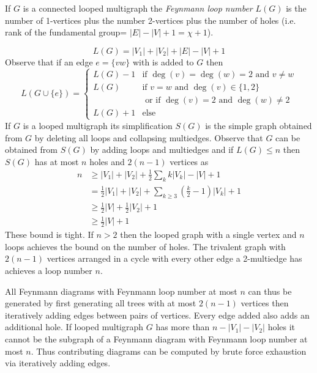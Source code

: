 \documentclass[12pt]{article}
\begin{document}
If $G$ is a connected looped multigraph the \emph{Feynmann loop number} 
$L(G)$ is
the number of 1-vertices plus the number 2-vertices plus the number of holes
(i.e. rank of the fundamental group= $|E|-|V|+1 =\chi+1$).

$$
L(G)=|V_1|+|V_2|+|E|-|V|+1
$$
Observe that if an edge $e=\{vw\}$  with is added to $G$ then
$$
 L(G\cup\{e\}) =
  \begin{cases}
   L(G)-1 & \text{if } \deg(v)=\deg(w)=2 \mbox{ and } v \neq w \\
   L(G) & \text{if } v=w \mbox{ and } \deg(v) \in \{1,2\} \\
        & \text{ or if } \deg(v)=2 \mbox{ and } \deg(w) \neq 2 \\
   L(G)+1  &  \text{else}
  \end{cases}
$$     
If $G$ is a looped multigraph its simplification $S(G)$ is the simple graph
obtained from $G$ by deleting all loops and collapsing multiedges.
Observe that $G$ can be obtained from $S(G)$ by adding loops and multiedges and
if $L(G) \leq n$ then $S(G)$ has at most $n$ holes and $2(n-1)$ vertices as
\begin{align*}
n &\geq |V_1|+|V_2| + \frac 1 2 \sum_k k|V_k| -|V|+1 \\
&= \frac 1 2 |V_1| + |V_2| +\sum_{k\geq 3} \left (\frac k 2 - 1 \right) |V_k|+1 \\
&\geq \frac 1 2 |V|+\frac 1 2 |V_2|+1 \\
&\geq \frac 1 2 |V|+1 
\end{align*}
These bound is tight. If $n>2$ then the looped graph with a single vertex
and $n$ loops achieves the bound on the number of holes. 
The trivalent graph
with $2(n-1)$ vertices arranged in a cycle with every other edge a 2-multiedge
has  achieves a loop number $n$.

All Feynmann diagrams with Feynmann loop number at most $n$ can thus be generated by first generating all trees with at most $2(n-1)$ vertices then iteratively adding edges between pairs of vertices. 
Every edge added also adds an additional hole. 
If looped multigraph $G$ has more than $n-|V_1|-|V_2|$ holes it cannot be the subgraph of a Feynmann diagram with Feynmann loop number at most $n$.
Thus contributing diagrams can be computed by brute force exhaustion via iteratively adding edges.
                                                                              
\end{document}
